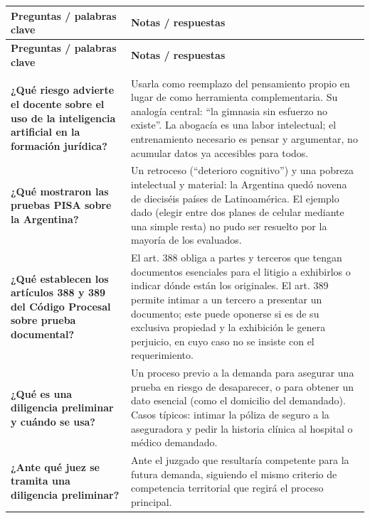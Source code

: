 \documentclass[12pt,oneside]{book}
\begin{document}
\begin{longtable}{
    >{\raggedright\arraybackslash}p{}
    >{\raggedright\arraybackslash}p{}
}
\toprule
\textbf{Preguntas / palabras clave} & \textbf{Notas / respuestas} \\
\midrule
\endfirsthead

\toprule
\textbf{Preguntas / palabras clave} & \textbf{Notas / respuestas} \\
\midrule
\endhead

\midrule
\multicolumn{2}{r}{\textit{Continúa en la página siguiente}} \\
\endfoot

\bottomrule
\endlastfoot

\textbf{¿Qué riesgo advierte el docente sobre el uso de la inteligencia artificial en la formación jurídica?} &
Usarla como reemplazo del pensamiento propio en lugar de como herramienta complementaria. Su analogía central: ``la gimnasia sin esfuerzo no existe''. La abogacía es una labor intelectual; el entrenamiento necesario es pensar y argumentar, no acumular datos ya accesibles para todos. \\

\textbf{¿Qué mostraron las pruebas PISA sobre la Argentina?} &
Un retroceso (``deterioro cognitivo'') y una pobreza intelectual y material: la Argentina quedó novena de dieciséis países de Latinoamérica. El ejemplo dado (elegir entre dos planes de celular mediante una simple resta) no pudo ser resuelto por la mayoría de los evaluados. \\

\textbf{¿Qué establecen los artículos 388 y 389 del Código Procesal sobre prueba documental?} &
El art. 388 obliga a partes y terceros que tengan documentos esenciales para el litigio a exhibirlos o indicar dónde están los originales. El art. 389 permite intimar a un tercero a presentar un documento; este puede oponerse si es de su exclusiva propiedad y la exhibición le genera perjuicio, en cuyo caso no se insiste con el requerimiento. \\

\textbf{¿Qué es una diligencia preliminar y cuándo se usa?} &
Un proceso previo a la demanda para asegurar una prueba en riesgo de desaparecer, o para obtener un dato esencial (como el domicilio del demandado). Casos típicos: intimar la póliza de seguro a la aseguradora y pedir la historia clínica al hospital o médico demandado. \\

\textbf{¿Ante qué juez se tramita una diligencia preliminar?} &
Ante el juzgado que resultaría competente para la futura demanda, siguiendo el mismo criterio de competencia territorial que regirá el proceso principal. \\


\end{longtable}
\end{document}

